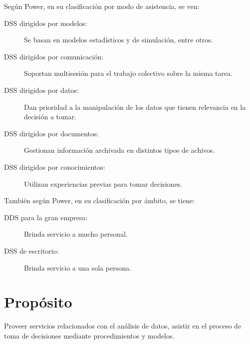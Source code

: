 Según Power, en su clasificación por modo de asistencia, se ven:
\begin{description}
\item [DSS dirigidos por modelos:] Se basan en modelos estadísticos y de simulación, entre otros.
\item [DSS dirigidos por comunicación:] Soportan multisesión para el trabajo colectivo sobre la misma tarea.
\item [DSS dirigidos por datos:] Dan prioridad a la manipulación de los datos que tienen relevancia en la decisión a tomar.
\item [DSS dirigidos por documentos:] Gestionan información archivada en distintos tipos de achivos.
\item [DSS dirigidos por conocimientos:] Utilizan experiencias previas para tomar decisiones.
\end{description}

También según Power, en su clasificación por ámbito, se tiene:
\begin{description}
\item [DDS para la gran empresa:] Brinda servicio a mucho personal.
\item [DSS de escritorio:] Brinda servicio a una sola persona.
\end{description}

\section {Propósito}
Proveer servicios relacionados con el análisis de datos, asistir en el proceso de toma de decisiones mediante procedimientos y modelos.

